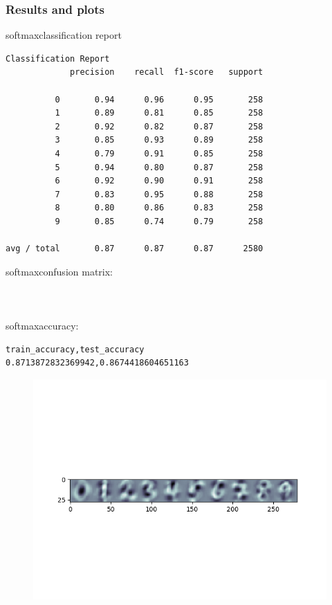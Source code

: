 \documentclass[paper=a4, fontsize=11pt]{scrartcl} %
\numberwithin{equation}{section} %
\numberwithin{figure}{section} %
\numberwithin{table}{section} %
\begin{document}
\subsubsection{Results and plots}
softmax\textunderscore classification \textunderscore report
\begin{verbatim}
Classification Report
             precision    recall  f1-score   support

          0       0.94      0.96      0.95       258
          1       0.89      0.81      0.85       258
          2       0.92      0.82      0.87       258
          3       0.85      0.93      0.89       258
          4       0.79      0.91      0.85       258
          5       0.94      0.80      0.87       258
          6       0.92      0.90      0.91       258
          7       0.83      0.95      0.88       258
          8       0.80      0.86      0.83       258
          9       0.85      0.74      0.79       258

avg / total       0.87      0.87      0.87      2580
\end{verbatim}

softmax\textunderscore confusion \textunderscore matrix: \\
  \\ \\ \\
softmax\textunderscore accuracy: \\
\begin{verbatim}
train_accuracy,test_accuracy
0.8713872832369942,0.8674418604651163
\end{verbatim}

\begin{figure}[h]
\center
\includegraphics[trim={0 4.5cm 0 5cm},clip]{softmax_parameter_plot_1_128.png}
\end{figure}
\end{document}
